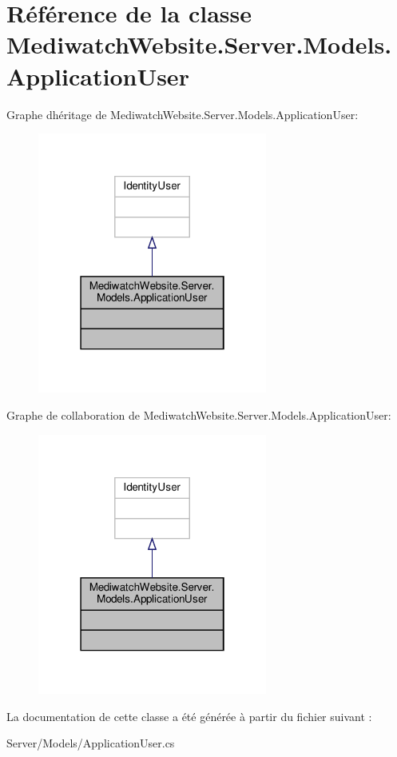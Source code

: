 \hypertarget{class_mediwatch_website_1_1_server_1_1_models_1_1_application_user}{}\section{Référence de la classe Mediwatch\+Website.\+Server.\+Models.\+Application\+User}
\label{class_mediwatch_website_1_1_server_1_1_models_1_1_application_user}


Graphe d\textquotesingle{}héritage de Mediwatch\+Website.\+Server.\+Models.\+Application\+User\+:\nopagebreak
\begin{figure}[H]
\begin{center}
\leavevmode
\includegraphics[width=214pt]{class_mediwatch_website_1_1_server_1_1_models_1_1_application_user__inherit__graph}
\end{center}
\end{figure}


Graphe de collaboration de Mediwatch\+Website.\+Server.\+Models.\+Application\+User\+:\nopagebreak
\begin{figure}[H]
\begin{center}
\leavevmode
\includegraphics[width=214pt]{class_mediwatch_website_1_1_server_1_1_models_1_1_application_user__coll__graph}
\end{center}
\end{figure}


La documentation de cette classe a été générée à partir du fichier suivant \+:\begin{DoxyCompactItemize}
\item 
Server/\+Models/Application\+User.\+cs\end{DoxyCompactItemize}
